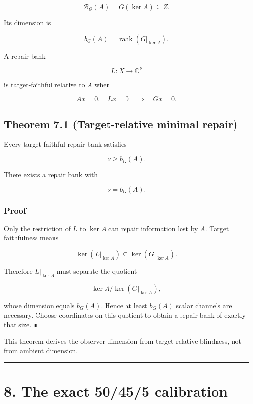 \[
\boxed{
\mathcal B_G(A)=G(\ker A)\subseteq Z.
}
\]

Its dimension is

\[
\boxed{
b_G(A)=\operatorname{rank}(G|_{\ker A}).}
\]

A repair bank

\[
L:X\longrightarrow\mathbb C^\nu
\]

is target-faithful relative to \(A\) when

\[
Ax=0,\quad Lx=0
\quad\Longrightarrow\quad
Gx=0.
\]

\hypertarget{theorem-7.1-target-relative-minimal-repair}{%
\subsection{Theorem 7.1 (Target-relative minimal repair)}\label{theorem-7.1-target-relative-minimal-repair}}

Every target-faithful repair bank satisfies

\[
\nu\ge b_G(A).
\]

There exists a repair bank with

\[
\nu=b_G(A).
\]

\hypertarget{proof-3}{%
\subsubsection{Proof}\label{proof-3}}

Only the restriction of \(L\) to \(\ker A\) can repair information lost by
\(A\). Target faithfulness means

\[
\ker(L|_{\ker A})
\subseteq
\ker(G|_{\ker A}).
\]

Therefore \(L|_{\ker A}\) must separate the quotient

\[
\ker A/\ker(G|_{\ker A}),
\]

whose dimension equals \(b_G(A)\). Hence at least \(b_G(A)\) scalar channels
are necessary. Choose coordinates on this quotient to obtain a repair bank of
exactly that size. ∎

This theorem derives the observer dimension from target-relative blindness, not
from ambient dimension.

\begin{center}\rule{0.5\linewidth}{0.5pt}\end{center}

\hypertarget{the-exact-50455-calibration}{%
\section{8. The exact 50/45/5 calibration}\label{the-exact-50455-calibration}}

